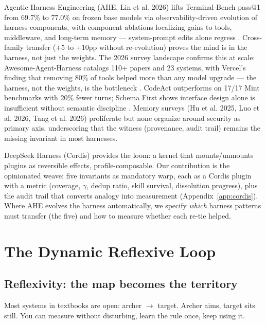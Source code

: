 \documentclass[11pt]{article}
\begin{document}
Agentic Harness Engineering (AHE, Lin et al. 2026) lifts Terminal-Bench pass@1 from 69.7\% to 77.0\% on frozen base models via observability-driven evolution of harness components, with component ablations localizing gains to tools, middleware, and long-term memory --- system-prompt edits alone regress \citep{lin2026ahe}. Cross-family transfer ($+5$ to $+10$pp without re-evolution) proves the mind is in the harness, not just the weights. The 2026 survey landscape confirms this at scale: Awesome-Agent-Harness catalogs 110+ papers and 23 systems, with Vercel's finding that removing 80\% of tools helped more than any model upgrade --- the harness, not the weights, is the bottleneck \citep{lin2026ahe}. CodeAct outperforms on 17/17 Mint benchmarks with 20\% fewer turns; Schema First shows interface design alone is insufficient without semantic discipline \citep{lin2026ahe}. Memory surveys (Hu et al. 2025, Luo et al. 2026, Tang et al. 2026) proliferate but none organize around security as primary axis, underscoring that the witness (provenance, audit trail) remains the missing invariant in most harnesses.

DeepSeek Harness (Cordis) provides the loom: a kernel that mounts/unmounts plugins as reversible effects, profile-composable. Our contribution is the opinionated weave: five invariants as mandatory warp, each as a Cordis plugin with a metric (coverage, $\gamma$, dedup ratio, skill survival, dissolution progress), plus the audit trail that converts analogy into measurement (Appendix~\ref{app:cordis}). Where AHE evolves the harness automatically, we specify \emph{which} harness patterns must transfer (the five) and how to measure whether each re-tie helped.

\section{The Dynamic Reflexive Loop}
\label{sec:loop}

\subsection{Reflexivity: the map becomes the territory}

Most systems in textbooks are open: archer $\to$ target. Archer aims, target sits still. You can measure without disturbing, learn the rule once, keep using it.
\end{document}
